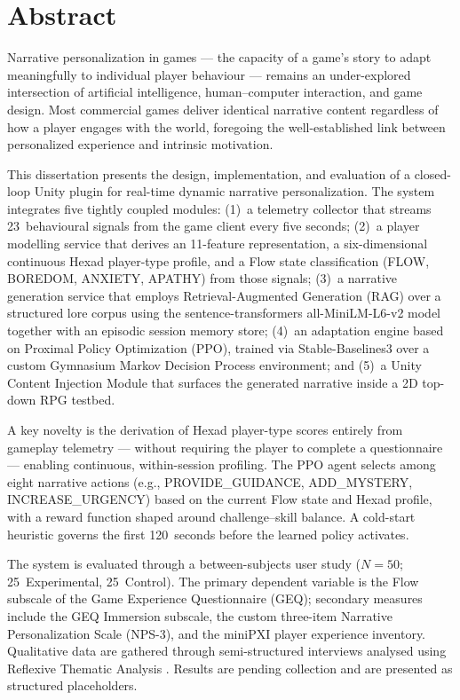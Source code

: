 \documentclass[12pt,a4paper]{report}
\begin{document}
\chapter*{Abstract}

Narrative personalization in games --- the capacity of a game's story to adapt meaningfully to individual player behaviour --- remains an under-explored intersection of artificial intelligence, human--computer interaction, and game design. Most commercial games deliver identical narrative content regardless of how a player engages with the world, foregoing the well-established link between personalized experience and intrinsic motivation.

This dissertation presents the design, implementation, and evaluation of a closed-loop Unity plugin for real-time dynamic narrative personalization. The system integrates five tightly coupled modules: (1)~a telemetry collector that streams 23~behavioural signals from the game client every five seconds; (2)~a player modelling service that derives an 11-feature representation, a six-dimensional continuous Hexad player-type profile, and a Flow state classification (FLOW, BOREDOM, ANXIETY, APATHY) from those signals; (3)~a narrative generation service that employs Retrieval-Augmented Generation (RAG) over a structured lore corpus using the sentence-transformers all-MiniLM-L6-v2 model together with an episodic session memory store; (4)~an adaptation engine based on Proximal Policy Optimization (PPO), trained via Stable-Baselines3 over a custom Gymnasium Markov Decision Process environment; and (5)~a Unity Content Injection Module that surfaces the generated narrative inside a 2D top-down RPG testbed.

A key novelty is the derivation of Hexad player-type scores entirely from gameplay telemetry --- without requiring the player to complete a questionnaire --- enabling continuous, within-session profiling. The PPO agent selects among eight narrative actions (e.g., PROVIDE\_GUIDANCE, ADD\_MYSTERY, INCREASE\_URGENCY) based on the current Flow state and Hexad profile, with a reward function shaped around challenge--skill balance. A cold-start heuristic governs the first 120~seconds before the learned policy activates.

The system is evaluated through a between-subjects user study ($N = 50$; 25~Experimental, 25~Control). The primary dependent variable is the Flow subscale of the Game Experience Questionnaire (GEQ); secondary measures include the GEQ Immersion subscale, the custom three-item Narrative Personalization Scale (NPS-3), and the miniPXI player experience inventory. Qualitative data are gathered through semi-structured interviews analysed using Reflexive Thematic Analysis \citep{braun2022thematic}. Results are pending collection and are presented as structured placeholders.
\end{document}
